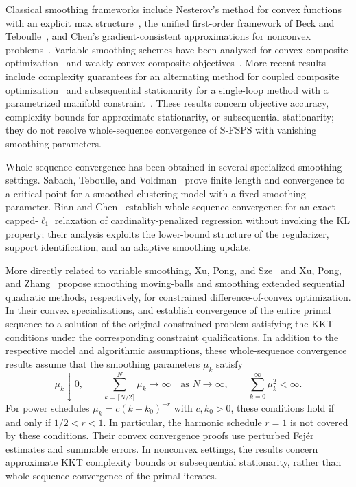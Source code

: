 \documentclass[9pt]{article}
\numberwithin{equation}{section}
\theoremstyle{definition}
\theoremstyle{remark}
\begin{document}
Classical smoothing frameworks include Nesterov's method for convex
functions with an explicit max structure~\cite{Nesterov2005}, the unified
first-order framework of Beck and Teboulle~\cite{BeckTeboulle2012},
and Chen's gradient-consistent approximations for nonconvex
problems~\cite{Chen2012}.
Variable-smoothing schemes have been analyzed for convex composite
optimization~\cite{BotBohm2020} and weakly convex composite
objectives~\cite{BohmWright2021}.
More recent results include complexity guarantees for an alternating
method for coupled composite optimization~\cite{LongEtAl2026} and
subsequential stationarity for a single-loop method with a parametrized
manifold constraint~\cite{KumeYamada2026}.
These results concern objective accuracy, complexity bounds for
approximate stationarity, or subsequential stationarity; they do not
resolve whole-sequence convergence of S-FSPS with vanishing
smoothing parameters.

Whole-sequence convergence has been obtained in several specialized
smoothing settings. Sabach, Teboulle, and
Voldman~\cite{SabachTeboulleVoldman2018} prove finite length and
convergence to a critical point for a smoothed clustering model with
a fixed smoothing parameter. Bian and Chen~\cite{BianChen2020}
establish whole-sequence convergence for an exact capped-$\ell_1$
relaxation of cardinality-penalized regression without invoking the
KL property; their analysis exploits the lower-bound structure of the
regularizer, support identification, and an adaptive smoothing update.

More directly related to variable smoothing, Xu, Pong, and
Sze~\cite{XuPongSze2026} and Xu, Pong, and
Zhang~\cite{XuPongZhang2026} propose smoothing moving-balls and
smoothing extended sequential quadratic methods, respectively, for
constrained difference-of-convex optimization.
In their convex specializations,
\cite[Theorem~4.3]{XuPongSze2026} and
\cite[Theorem~4.1]{XuPongZhang2026} establish convergence of the entire
primal sequence to a solution of the original constrained problem
satisfying the KKT conditions under the corresponding constraint
qualifications.
In addition to the respective model and algorithmic assumptions,
these whole-sequence convergence results assume that the smoothing
parameters $\mu_k$ satisfy
\begin{equation}\label{sum}
\mu_k\downarrow0,\qquad
\sum_{k=\lceil N/2\rceil}^{N}\mu_k\longrightarrow\infty
\quad\text{as }N\to\infty,
\qquad
\sum_{k=0}^{\infty}\mu_k^2<\infty.
\end{equation}
For power schedules $\mu_k=c(k+k_0)^{-r}$ with $c,k_0>0$,
these conditions hold if and only if $1/2<r<1$.
In particular, the harmonic schedule $r=1$ is not covered by
these conditions.
Their convex convergence proofs use perturbed Fej\'er estimates
and summable errors.
In nonconvex settings, the results concern approximate KKT
complexity bounds or subsequential stationarity, rather than
whole-sequence convergence of the primal iterates.
\end{document}
